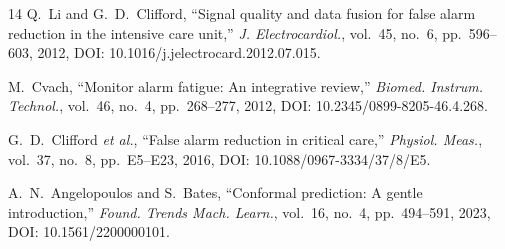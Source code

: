 \documentclass[conference]{IEEEtran}
\begin{document}
\begin{thebibliography}{14}
Q.~Li and G.~D.~Clifford, ``Signal quality and data fusion for false alarm reduction in the intensive care unit,'' \emph{J. Electrocardiol.}, vol.~45, no.~6, pp.~596--603, 2012, DOI: 10.1016/j.jelectrocard.2012.07.015.

M.~Cvach, ``Monitor alarm fatigue: An integrative review,'' \emph{Biomed. Instrum. Technol.}, vol.~46, no.~4, pp.~268--277, 2012, DOI: 10.2345/0899-8205-46.4.268.

G.~D.~Clifford \emph{et al.}, ``False alarm reduction in critical care,'' \emph{Physiol. Meas.}, vol.~37, no.~8, pp.~E5--E23, 2016, DOI: 10.1088/0967-3334/37/8/E5.

A.~N.~Angelopoulos and S.~Bates, ``Conformal prediction: A gentle introduction,'' \emph{Found. Trends Mach. Learn.}, vol.~16, no.~4, pp.~494--591, 2023, DOI: 10.1561/2200000101.

\end{thebibliography}
\end{document}

